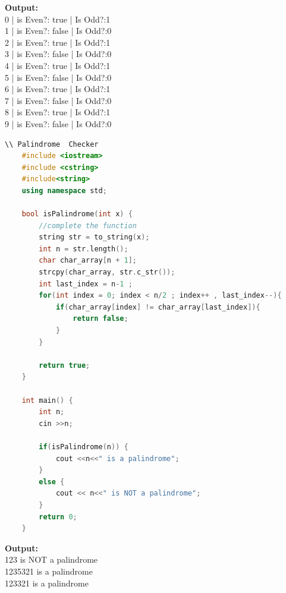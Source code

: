 \documentclass[12pt , a4paper]{article}
\begin{document}
	\begin{tcolorbox}
	\textbf{Output:}\\
	0 | is Even?: true | Is Odd?:1\\
	1 | is Even?: false | Is Odd?:0\\
	2 | is Even?: true | Is Odd?:1\\
	3 | is Even?: false | Is Odd?:0\\
	4 | is Even?: true | Is Odd?:1\\
	5 | is Even?: false | Is Odd?:0\\
	6 | is Even?: true | Is Odd?:1\\
	7 | is Even?: false | Is Odd?:0\\
	8 | is Even?: true | Is Odd?:1\\
	9 | is Even?: false | Is Odd?:0
	\end{tcolorbox}



	
	\begin{lstlisting}[language=C++]
	\\ Palindrome  Checker
	#include <iostream>
	#include <cstring>
	#include<string>
	using namespace std;
	
	bool isPalindrome(int x) {
	    //complete the function
	    string str = to_string(x);
	    int n = str.length();
	    char char_array[n + 1];
	    strcpy(char_array, str.c_str());
	    int last_index = n-1 ;
	    for(int index = 0; index < n/2 ; index++ , last_index--){
	        if(char_array[index] != char_array[last_index]){
	            return false;
	        }
	    }
	
	    return true;
	}
	
	int main() {
	    int n;
	    cin >>n;
	
	    if(isPalindrome(n)) {
	        cout <<n<<" is a palindrome";
	    }
	    else {
	        cout << n<<" is NOT a palindrome";
	    }
	    return 0;
	}

	\end{lstlisting}

	\begin{tcolorbox}
	\textbf{Output:}\\
	123 is NOT a palindrome\\
	1235321 is a palindrome\\
	123321 is a palindrome
	\end{tcolorbox}
\end{document}
